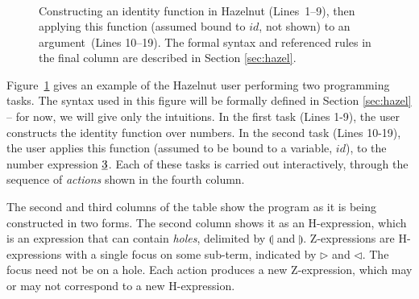 \documentclass{llncs}
\begin{document}
\begin{figure}[t]
\[\begin{array}{|c||c|c||l|l|}
\end{array}
\]
\caption{Constructing an identity function in Hazelnut (Lines~1--9), then  applying this function (assumed bound to $id$, not shown) to an argument~(Lines 10--19). The formal syntax and referenced rules in the final column are described in Section \ref{sec:hazel}.}
\label{fig:first-example}
\end{figure}
%
Figure~\ref{fig:first-example} gives an example of the Hazelnut user
performing two programming tasks. 
The syntax used in this figure will be formally defined in Section \ref{sec:hazel} -- for now, we will give only the intuitions. In the first task (Lines 1-9), the user constructs the identity function over numbers. In the second task (Lines 10-19), the user applies this function (assumed to be bound to a variable, $id$), to the number expression $\underline{3}$. 
Each of these tasks is carried out interactively, through the sequence of \emph{actions} shown in the fourth column. 

The second and third columns of the
table show the program as it is being constructed in two forms. The second column shows it as an H-expression, which is an expression that can contain \emph{holes}, delimited by $\llparenthesis$ and $\rrparenthesis$. Z-expressions
are H-expressions with a single focus on some sub-term, indicated by $\triangleright$ and $\triangleleft$. The focus need not be on a hole. 
Each action produces a new Z-expression, which may or may not correspond to a new H-expression.
\end{document}

